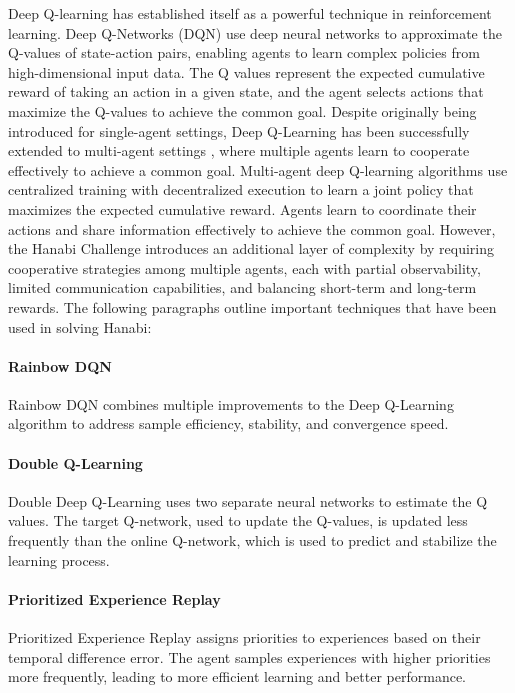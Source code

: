 Deep Q-learning \cite{mnihPlayingAtariDeep2013} has established itself as a powerful technique in reinforcement learning. Deep Q-Networks (DQN) use deep neural networks to approximate the Q-values of state-action pairs, enabling agents to learn complex policies from high-dimensional input data. The Q values represent the expected cumulative reward of taking an action in a given state, and the agent selects actions that maximize the Q-values to achieve the common goal.
Despite originally being introduced for single-agent settings, Deep Q-Learning has been successfully extended to multi-agent settings \cite{hafizDeepQNetworkBased2020,huSimplifiedActionDecoder2021,bardHanabiChallengeNew2020a,canaanEvaluatingRlAgents2020,grootenDeepReinforcementLearning2021}, where multiple agents learn to cooperate effectively to achieve a common goal. Multi-agent deep Q-learning algorithms use centralized training with decentralized execution to learn a joint policy that maximizes the expected cumulative reward. Agents learn to coordinate their actions and share information effectively to achieve the common goal.
However, the Hanabi Challenge \cite{bardHanabiChallengeNew2020a} introduces an additional layer of complexity by requiring cooperative strategies among multiple agents, each with partial observability, limited communication capabilities, and balancing short-term and long-term rewards.
The following paragraphs outline important techniques that have been used in solving Hanabi:
\paragraph*{Rainbow DQN}
Rainbow DQN \cite{hesselRainbowCombiningImprovements2017} combines multiple improvements to the Deep Q-Learning algorithm to address sample efficiency, stability, and convergence speed.
\paragraph*{Double Q-Learning}
Double Deep Q-Learning \cite{hasseltDeepReinforcementLearning2016a} uses two separate neural networks to estimate the Q values. The target Q-network, used to update the Q-values, is updated less frequently than the online Q-network, which is used to predict and stabilize the learning process.
\paragraph*{Prioritized Experience Replay}
Prioritized Experience Replay \cite{schaulPrioritizedExperienceReplay2016} assigns priorities to experiences based on their temporal difference error. The agent samples experiences with higher priorities more frequently, leading to more efficient learning and better performance.
